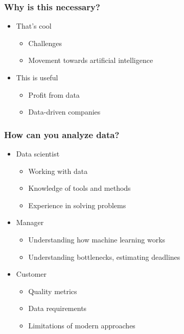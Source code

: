 \documentclass[default]{beamer}
\begin{document}
	\begin{frame}
		\frametitle{Why is this necessary?}
		
		\Large
		\begin{itemize}
			\item That's cool
			\begin{itemize}
				\item Challenges
				\item Movement towards artificial intelligence
			\end{itemize}
			\item This is useful
			\begin{itemize}
				\item Profit from data
				\item Data-driven companies
				
			\end{itemize}
		\end{itemize}

	\end{frame}

	\begin{frame}
		\frametitle{How can you analyze data?}
		
		\Large
		\begin{itemize}
			\item Data scientist
			\begin{itemize}
				\item Working with data
				\item Knowledge of tools and methods
				\item Experience in solving problems
			\end{itemize}
			\item Manager
			\begin{itemize}
				\item Understanding how machine learning works
				\item Understanding bottlenecks, estimating deadlines
			\end{itemize}
			\item Customer
			\begin{itemize}
				\item Quality metrics
				\item Data requirements
				\item Limitations of modern approaches
			\end{itemize}
		
		\end{itemize}
		
	\end{frame}
\end{document}
